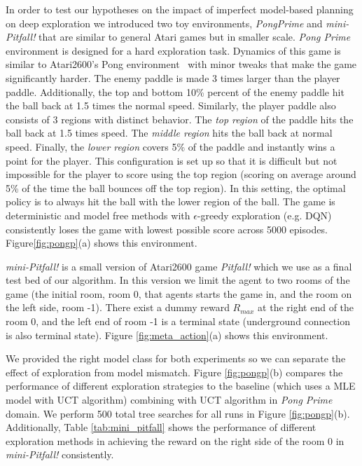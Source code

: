 In order to test our hypotheses on the impact of imperfect model-based planning on deep exploration we introduced two toy environments, \textit{PongPrime} and \textit{mini-Pitfall!} that are similar to general Atari games but in smaller scale. \textit{Pong Prime} environment is designed for a hard exploration task. Dynamics of this game is similar to Atari2600's Pong environment~\citep{bellemare2013arcade} with minor tweaks that make the game significantly harder. The enemy paddle is made 3 times larger than the player paddle.
Additionally, the top and bottom 10\% percent of the enemy paddle hit the ball back at 1.5 times the normal speed.
Similarly, the player paddle also consists of 3 regions with distinct behavior. The \emph{top region} of the paddle hits the ball back at 1.5 times speed. The \emph{middle region} hits the ball back at normal speed. Finally, the \emph{lower region} covers 5\% of the paddle and instantly wins a point for the player. This configuration is set up so that it is difficult but not impossible for the player to score using the top region (scoring on average around 5\% of the time the ball bounces off the top region). In this setting, the optimal policy is to always hit the ball with the lower region of the ball. The game is deterministic and model free methods with $\epsilon$-greedy exploration (e.g. DQN) consistently loses the game with lowest possible score across 5000 episodes. Figure\ref{fig:pongp}(a) shows this environment. 

\textit{mini-Pitfall!} is a small version of Atari2600 game \textit{Pitfall!} which we use as a final test bed of our algorithm. In this version we limit the agent to two rooms of the game (the initial room, room 0, that agents starts the game in, and the room on the left side, room -1). There exist a dummy reward $R_{max}$ at the right end of the room 0, and the left end of room -1 is a terminal state (underground connection is also terminal state). Figure \ref{fig:meta_action}(a) shows this environment. 

We provided the right model class for both experiments so we can separate the effect of exploration from model mismatch. Figure \ref{fig:pongp}(b) compares the performance of different exploration strategies to the baseline (which uses a MLE model with UCT algorithm) combining with UCT algorithm in \textit{Pong Prime} domain. We perform 500 total tree searches for all runs in Figure \ref{fig:pongp}(b). Additionally, Table \ref{tab:mini_pitfall} shows the performance of different exploration methods in achieving the reward on the right side of the room 0 in \textit{mini-Pitfall!} consistently. 


